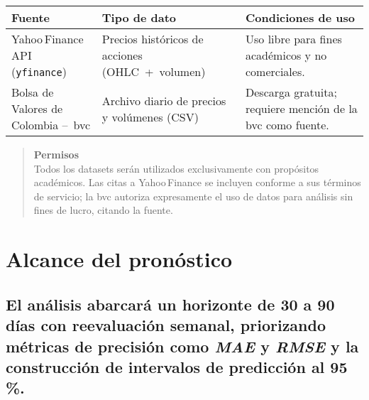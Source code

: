 \documentclass[
  11pt,
]{book}
\begin{document}
\begin{longtable}[]{@{}
  >{\raggedright\arraybackslash}p{}
  >{\raggedright\arraybackslash}p{}
  >{\raggedright\arraybackslash}p{}@{}}
\toprule\noalign{}
\begin{minipage}[b]{\linewidth}\raggedright
Fuente
\end{minipage} & \begin{minipage}[b]{\linewidth}\raggedright
Tipo de dato
\end{minipage} & \begin{minipage}[b]{\linewidth}\raggedright
Condiciones de uso
\end{minipage} \\
\midrule\noalign{}
\endhead
\bottomrule\noalign{}
\endlastfoot
Yahoo\,Finance API (\texttt{yfinance}) & Precios históricos de acciones (OHLC~+~volumen) & Uso libre para fines académicos y no comerciales. \\
Bolsa de Valores de Colombia --~bvc & Archivo diario de precios y volúmenes (CSV) & Descarga gratuita; requiere mención de la bvc como fuente. \\
\end{longtable}

\begin{quote}
\textbf{Permisos}\\
Todos los datasets serán utilizados exclusivamente con propósitos académicos. Las citas a Yahoo\,Finance se incluyen conforme a sus términos de servicio; la bvc autoriza expresamente el uso de datos para análisis sin fines de lucro, citando la fuente.
\end{quote}

\chapter{Alcance del pronóstico}\label{alcance-del-pronuxf3stico}

\section{\texorpdfstring{El análisis abarcará un horizonte de \textbf{30 a 90\,días} con reevaluación semanal, priorizando métricas de precisión como \emph{MAE} y \emph{RMSE} y la construcción de intervalos de predicción al 95\,\%.}{El análisis abarcará un horizonte de 30 a 90\,días con reevaluación semanal, priorizando métricas de precisión como MAE y RMSE y la construcción de intervalos de predicción al 95\,\%.}}\label{el-anuxe1lisis-abarcaruxe1-un-horizonte-de-30-a-90-duxedas-con-reevaluaciuxf3n-semanal-priorizando-muxe9tricas-de-precisiuxf3n-como-mae-y-rmse-y-la-construcciuxf3n-de-intervalos-de-predicciuxf3n-al-95-.}
\end{document}
